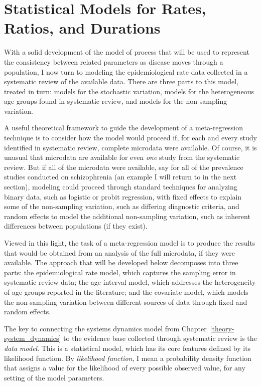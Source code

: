 \chapter{Statistical Models for Rates, Ratios, and Durations}
\label{theory-rate_model}

With a solid development of the model of process that will be used to
represent the consistency between related parameters as disease
moves through a population, I now turn to modeling the
epidemiological rate data collected in a systematic review of the
available data.  There are three parts to this model, treated in turn:
models for the stochastic variation, models for the heterogeneous age
groups found in systematic review, and models for the non-sampling
variation.

A useful theoretical framework to guide the development of
a meta-regression technique is to consider how the model would proceed
if, for each and every study identified in systematic review, complete
microdata were available.  Of course, it is unusual that microdata are
available for even \emph{one} study from the systematic review.  But
if all of the microdata were available, say for all of the prevalence
studies conducted on schizophrenia (an example I will return to in
the next section), modeling could proceed through standard techniques
for analyzing binary data, such as logistic or probit regression, with
fixed effects to explain some of the non-sampling variation, such as
differing diagnostic criteria, and random effects to model the
additional non-sampling variation, such as inherent differences
between populations (if they exist).

Viewed in this light, the task of a meta-regression model is to
produce the results that would be obtained from an analysis of the
full microdata, if they were available. The approach that will be
developed below decomposes into three parts: the epidemiological rate
model, which captures the sampling error in systematic review data;
the age-interval model, which addresses the heterogeneity of age
groups reported in the literature; and the covariate model, which
models the non-sampling variation between different sources of data
through fixed and random effects.

The key to connecting the systems dynamics model from
Chapter~\ref{theory-system_dynamics} to the evidence base collected
through systematic review is the \emph{data model}.  This is a
statistical model, which has its core features defined by its
likelihood function.  By \emph{likelihood function}, I mean a
probability density function that assigns a value for the likelihood
of every possible observed value, for any setting of the model
parameters.

